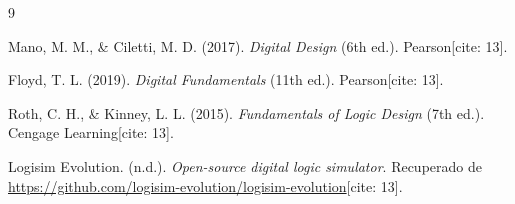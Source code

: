 \documentclass[12pt,a4paper]{article}
\begin{document}
\begin{thebibliography}{9}

     Mano, M. M., \& Ciletti, M. D. (2017). 
    \textit{Digital Design} (6th ed.). Pearson[cite: 13].
    
     Floyd, T. L. (2019). 
    \textit{Digital Fundamentals} (11th ed.). Pearson[cite: 13].
    
     Roth, C. H., \& Kinney, L. L. (2015). 
    \textit{Fundamentals of Logic Design} (7th ed.). Cengage Learning[cite: 13].
    
     Logisim Evolution. (n.d.). 
    \textit{Open-source digital logic simulator}. Recuperado de 
    \url{https://github.com/logisim-evolution/logisim-evolution}[cite: 13].

\end{thebibliography}
\end{document}
